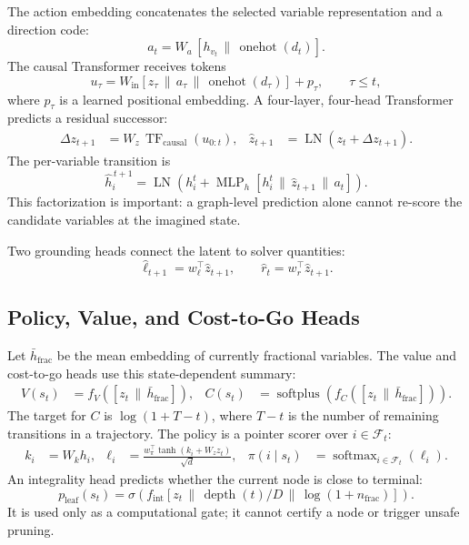 \documentclass{article}
\newcommand{\softmax}{\operatorname{softmax}}
\newcommand{\fracset}{\mathcal{F}}
\begin{document}
The action embedding concatenates the selected variable representation and a direction code:
\begin{equation}
  a_t=W_a\,[h_{v_t}\,\|\,\operatorname{onehot}(d_t)].
  \label{eq:action}
\end{equation}
The causal Transformer receives tokens
\begin{equation}
  u_\tau=W_{\mathrm{in}}
  [z_\tau\,\|\,a_\tau\,\|\,\operatorname{onehot}(d_\tau)]
  +p_\tau ,
  \qquad \tau\le t ,
  \label{eq:token}
\end{equation}
where $p_\tau$ is a learned positional embedding. A four-layer, four-head Transformer predicts a residual successor:
\begin{align}
  \Delta z_{t+1}
    &=W_z\,\operatorname{TF}_{\mathrm{causal}}(u_{0:t}), &
  \widehat z_{t+1}
    &=\operatorname{LN}(z_t+\Delta z_{t+1}).
  \label{eq:latent-transition}
\end{align}
The per-variable transition is
\begin{equation}
  \widehat h_i^{\,t+1}
  =
  \operatorname{LN}\!\left(
    h_i^t+
    \operatorname{MLP}_h
      [h_i^t\,\|\,\widehat z_{t+1}\,\|\,a_t]
  \right).
  \label{eq:variable-transition}
\end{equation}
This factorization is important: a graph-level prediction alone cannot re-score the candidate variables at the imagined state.

Two grounding heads connect the latent to solver quantities:
\begin{equation}
  \widehat \ell_{t+1}=w_\ell^\top\widehat z_{t+1},
  \qquad
  \widehat r_t=w_r^\top\widehat z_{t+1}.
  \label{eq:grounding}
\end{equation}

\subsection{Policy, Value, and Cost-to-Go Heads}

Let $\bar h_{\mathrm{frac}}$ be the mean embedding of currently fractional variables. The value and cost-to-go heads use this state-dependent summary:
\begin{align}
  V(s_t)&=f_V([z_t\,\|\,\bar h_{\mathrm{frac}}]), &
  C(s_t)&=\operatorname{softplus}
       \left(f_C([z_t\,\|\,\bar h_{\mathrm{frac}}])\right).
  \label{eq:value-cost}
\end{align}
The target for $C$ is $\log(1+T-t)$, where $T-t$ is the number of remaining transitions in a trajectory. The policy is a pointer scorer over $i\in\fracset_t$:
\begin{align}
  k_i&=W_kh_i, &
  \ell_i&=
  \frac{w_\pi^\top
    \tanh(k_i+W_zz_t)}{\sqrt d}, &
  \pi(i\mid s_t)&=\softmax_{i\in\fracset_t}(\ell_i).
  \label{eq:policy}
\end{align}
An integrality head predicts whether the current node is close to terminal:
\begin{equation}
  p_{\mathrm{leaf}}(s_t)=
  \sigma\!\left(
    f_{\mathrm{int}}
      [z_t\,\|\,\operatorname{depth}(t)/D\,\|\,\log(1+n_{\mathrm{frac}})]
  \right).
  \label{eq:integrality}
\end{equation}
It is used only as a computational gate; it cannot certify a node or trigger
unsafe pruning.
\end{document}
